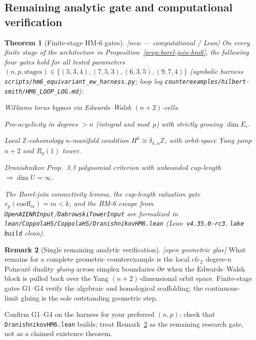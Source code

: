 \documentclass[11pt]{article}
\newtheorem{theorem}{Theorem}[section]
\theoremstyle{definition}
\newtheorem{remark}[theorem]{Remark}
\newcommand{\status}[1]{\textit{\textcolor{black!70}{[#1]}}}
\begin{document}
\subsection{Remaining analytic gate and computational verification}
\label{sec:hm6-gate}

\begin{theorem}[Finite-stage HM-6 gates]
\label{thm:hm6-gates}
\status{new --- computational / Lean}
On every finite stage of the architecture in
Proposition~\ref{prop:borel-join-hm6}, the following four gates hold for all
tested parameters $(n,p,\text{stages})\in\{(5,3,4),(7,5,3),(6,3,5),(9,7,4)\}$
(symbolic harness
\texttt{scripts/hm6\_equivariant\_ew\_harness.py}; loop log
\texttt{counterexamples/hilbert-smith/HM6\_LOOP\_LOG.md}):
\begin{description}[style=nextline,leftmargin=1.2em]
\item[G1] Williams torus bypass via Edwards--Walsh $(n+2)$-cells.
\item[G2] Pro-acyclicity in degrees $>n$ (integral and mod~$p$) with
strictly growing $\dim E_i$.
\item[G3] Local $\mathbb{Z}$-cohomology $n$-manifold condition
$H^k\cong\delta_{k,n}\mathbb{Z}$, with orbit-space Yang jump $n+2$ and
$R_p(1)$ tower.
\item[G4] Dranishnikov Prop.~3.3 polynomial criterion with unbounded
cup-length $\Rightarrow\dim U=\infty$.
\end{description}
The Borel-join connectivity lemma, the cup-length valuation gate
$v_p(\mathrm{coeff}_m)=m<k$, and the HM-6 escape from
\texttt{OpenAIENRInput}/\texttt{DabrowskiTowerInput} are formalized in
\texttt{lean/CoppolaHS/CoppolaHS/DranishnikovHM6.lean}
(Lean~\texttt{v4.35.0-rc3}, \texttt{lake build} clean).
\end{theorem}

\begin{remark}[Single remaining analytic verification]
\label{rmk:hm6-remaining}
\status{open geometric glue}
What remains for a complete geometric counterexample is the local
$clc_{\mathbb{Z}}$ degree-$n$ Poincar\'e duality \emph{gluing} across simplex
boundaries $\partial\sigma$ when the Edwards--Walsh block is pulled back over
the Yang $(n+2)$-dimensional orbit space.  Finite-stage gates G1--G4 verify
the algebraic and homological scaffolding; the continuous-limit gluing is the
sole outstanding geometric step.
\end{remark}

\begin{checkboxenv}
Confirm G1--G4 on the harness for your preferred $(n,p)$; check that
\texttt{DranishnikovHM6.lean} builds; treat Remark~\ref{rmk:hm6-remaining} as
the remaining research gate, not as a claimed existence theorem.
\end{checkboxenv}
\end{document}
